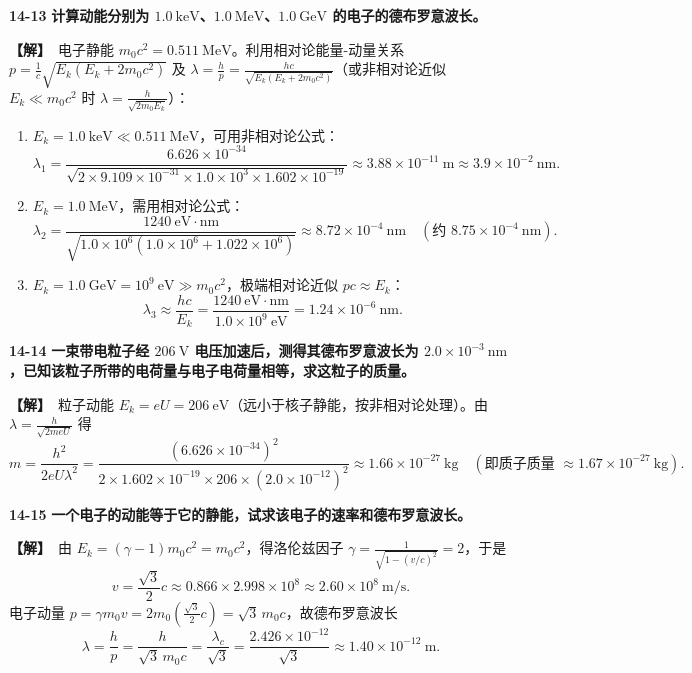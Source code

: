 \documentclass[zihao=5,a4paper,UTF8]{ctexart}
\newenvironment{prob}[2]{%
    \par\vspace{6pt}\noindent\textbf{\color{navy}#1} \textbf{#2}\par\nopagebreak\vspace{2pt}%
}{%
    \par\vspace{4pt}%
}
\newcommand{\sol}{\noindent\textbf{\color{tealaccent}【解】}\ }
\begin{document}
\begin{prob}{14-13}{计算动能分别为 $1.0\ \mathrm{keV}$、$1.0\ \mathrm{MeV}$、$1.0\ \mathrm{GeV}$ 的电子的德布罗意波长。}
\sol 电子静能 $m_0 c^2 = 0.511\ \mathrm{MeV}$。利用相对论能量-动量关系 $p = \frac{1}{c}\sqrt{E_k(E_k + 2m_0 c^2)}$ 及 $\lambda = \frac{h}{p} = \frac{hc}{\sqrt{E_k(E_k + 2m_0 c^2)}}$（或非相对论近似 $E_k \ll m_0 c^2$ 时 $\lambda = \frac{h}{\sqrt{2m_0 E_k}}$）：
\begin{enumerate}[leftmargin=2em, itemsep=2pt]
    \item $E_k = 1.0\ \mathrm{keV} \ll 0.511\ \mathrm{MeV}$，可用非相对论公式：
    \[
        \lambda_1 = \frac{6.626\times 10^{-34}}{\sqrt{2\times 9.109\times 10^{-31}\times 1.0\times 10^3\times 1.602\times 10^{-19}}} \approx 3.88\times 10^{-11}\ \mathrm{m} \approx 3.9\times 10^{-2}\ \mathrm{nm}.
    \]
    \item $E_k = 1.0\ \mathrm{MeV}$，需用相对论公式：
    \[
        \lambda_2 = \frac{1240\ \mathrm{eV\cdot nm}}{\sqrt{1.0\times 10^6(1.0\times 10^6 + 1.022\times 10^6)}} \approx 8.72\times 10^{-4}\ \mathrm{nm}\quad (\text{约 } 8.75\times 10^{-4}\ \mathrm{nm}).
    \]
    \item $E_k = 1.0\ \mathrm{GeV} = 10^9\ \mathrm{eV} \gg m_0 c^2$，极端相对论近似 $pc \approx E_k$：
    \[
        \lambda_3 \approx \frac{hc}{E_k} = \frac{1240\ \mathrm{eV\cdot nm}}{1.0\times 10^9\ \mathrm{eV}} = 1.24\times 10^{-6}\ \mathrm{nm}.
    \]
\end{enumerate}
\end{prob}

\begin{prob}{14-14}{一束带电粒子经 $206\ \mathrm{V}$ 电压加速后，测得其德布罗意波长为 $2.0\times 10^{-3}\ \mathrm{nm}$，已知该粒子所带的电荷量与电子电荷量相等，求这粒子的质量。}
\sol 粒子动能 $E_k = eU = 206\ \mathrm{eV}$（远小于核子静能，按非相对论处理）。由 $\lambda = \frac{h}{\sqrt{2meU}}$ 得
\[
    m = \frac{h^2}{2eU\lambda^2} = \frac{(6.626\times 10^{-34})^2}{2\times 1.602\times 10^{-19}\times 206\times (2.0\times 10^{-12})^2} \approx 1.66\times 10^{-27}\ \mathrm{kg}\quad (\text{即质子质量 } \approx 1.67\times 10^{-27}\ \mathrm{kg}).
\]
\end{prob}

\begin{prob}{14-15}{一个电子的动能等于它的静能，试求该电子的速率和德布罗意波长。}
\sol 由 $E_k = (\gamma - 1)m_0 c^2 = m_0 c^2$，得洛伦兹因子 $\gamma = \frac{1}{\sqrt{1 - (v/c)^2}} = 2$，于是
\[
    v = \frac{\sqrt{3}}{2}c \approx 0.866\times 2.998\times 10^8 \approx 2.60\times 10^8\ \mathrm{m/s}.
\]
电子动量 $p = \gamma m_0 v = 2 m_0\left(\frac{\sqrt{3}}{2}c\right) = \sqrt{3}\,m_0 c$，故德布罗意波长
\[
    \lambda = \frac{h}{p} = \frac{h}{\sqrt{3}\,m_0 c} = \frac{\lambda_c}{\sqrt{3}} = \frac{2.426\times 10^{-12}}{\sqrt{3}} \approx 1.40\times 10^{-12}\ \mathrm{m}.
\]
\end{prob}
\end{document}

